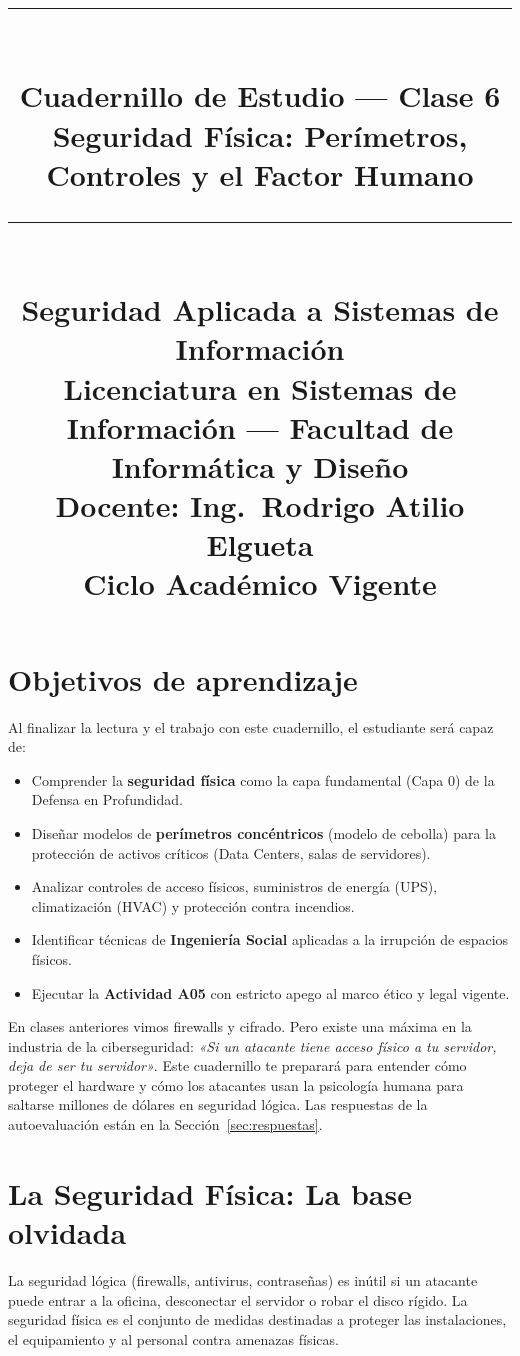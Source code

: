 \documentclass[11pt,a4paper]{article}
\title{%
  \rule{\textwidth}{1pt}\\[0.4cm]
  \textbf{\Large Cuadernillo de Estudio --- Clase 6}\\[0.2cm]
  \large Seguridad Física: Perímetros, Controles y el Factor Humano\\[0.2cm]
  \rule{\textwidth}{1pt}\\[0.4cm]
  \normalsize Seguridad Aplicada a Sistemas de Información\\
  Licenciatura en Sistemas de Información --- Facultad de Informática y Diseño\\
  Docente: Ing.\ Rodrigo Atilio Elgueta\\[0.2cm]
  \small Ciclo Académico Vigente
}
\author{}
\date{}
\begin{document}
\maketitle
\thispagestyle{fancy}
\tableofcontents
\newpage

\section{Objetivos de aprendizaje}
Al finalizar la lectura y el trabajo con este cuadernillo, el estudiante será capaz de:

\begin{itemize}[leftmargin=*]
  \item Comprender la \textbf{seguridad física} como la capa fundamental (Capa 0) de la Defensa en Profundidad.
  \item Diseñar modelos de \textbf{perímetros concéntricos} (modelo de cebolla) para la protección de activos críticos (Data Centers, salas de servidores).
  \item Analizar controles de acceso físicos, suministros de energía (UPS), climatización (HVAC) y protección contra incendios.
  \item Identificar técnicas de \textbf{Ingeniería Social} aplicadas a la irrupción de espacios físicos.
  \item Ejecutar la \textbf{Actividad A05} con estricto apego al marco ético y legal vigente.
\end{itemize}

\begin{clave}
En clases anteriores vimos firewalls y cifrado. Pero existe una máxima en la industria de la ciberseguridad: \textit{«Si un atacante tiene acceso físico a tu servidor, deja de ser tu servidor»}. Este cuadernillo te preparará para entender cómo proteger el hardware y cómo los atacantes usan la psicología humana para saltarse millones de dólares en seguridad lógica. Las respuestas de la autoevaluación están en la Sección~\ref{sec:respuestas}.
\end{clave}

\section{La Seguridad Física: La base olvidada}
La seguridad lógica (firewalls, antivirus, contraseñas) es inútil si un atacante puede entrar a la oficina, desconectar el servidor o robar el disco rígido. La seguridad física es el conjunto de medidas destinadas a proteger las instalaciones, el equipamiento y al personal contra amenazas físicas.
\end{document}
